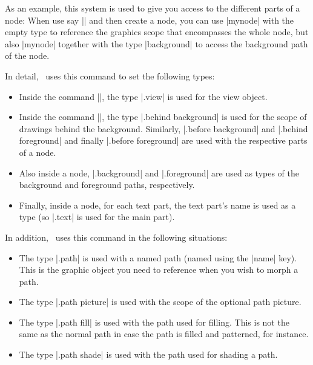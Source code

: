 \begin{command}{\pgfuseid{}}
\begin{command}{\pgfusetype{}}
        As an example, this system is used to give you access to the different
        parts of a node: When use say || and then create a
        node, you can use |mynode| with the empty type to reference the
        graphics scope that encompasses the whole node, but also |mynode|
        together with the type |background| to access the background path of
        the node.

        In detail, \pgfname\ uses this command to set the following types:
        \begin{itemize}
            \item Inside the command |\pgfviewboxscope|, the type |.view| is
                used for the view object.
            \item Inside the command |\pgfmultipartnode|, the type
                |.behind background| is used for the scope of drawings behind
                the background. Similarly, |.before background| and
                |.behind foreground| and finally |.before foreground| are used
                with the respective parts of a node.
            \item Also inside a node, |.background| and |.foreground| are used
                as types of the background and foreground paths, respectively.
            \item Finally, inside a node, for each text part, the text part's
                name is used as a type (so |.text| is used for the main part).
        \end{itemize}

        In addition, \tikzname\ uses this command in the following
        situations:
        \begin{itemize}
            \item The type |.path| is used with a named path (named using the
                |name| key). This is the graphic object you need to reference
                when you wish to morph a path.
            \item The type |.path picture| is used with the scope of the
                optional path picture.
            \item The type |.path fill| is used with the path used for filling.
                This is not the same as the normal path in case the path is
                filled and patterned, for instance.
            \item The type |.path shade| is used with the path used for shading
                a path.
        \end{itemize}
    \end{command}


\end{command}
